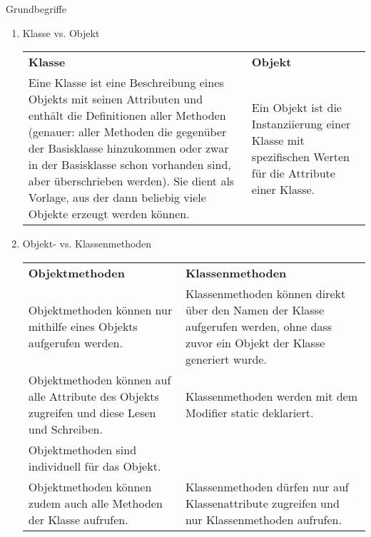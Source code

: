 \documentclass{../preamble}
\begin{document}
\begin{task}[credit = \stars{0}{3}]{Grundbegriffe}
    \begin{solution}
        \begin{enumerate}
            \item Klasse vs. Objekt
                  \begin{table}[h]
                      \centering
                      \begin{tabular}{p{22.5em}p{22.5em}}
                          \textbf{Klasse}                                                                                                                                                                                                                                                                                                                                       & \textbf{Objekt}
                          \\
                          Eine Klasse ist eine Beschreibung eines Objekts mit seinen Attributen und enthält die Definitionen aller Methoden (genauer: aller Methoden die gegenüber der Basisklasse hinzukommen oder zwar in der Basisklasse schon vorhanden sind, aber überschrieben werden). Sie dient als Vorlage, aus der dann beliebig viele Objekte erzeugt werden können. & Ein Objekt ist die Instanziierung einer Klasse mit spezifischen Werten für die Attribute einer Klasse.
                      \end{tabular}
                  \end{table}
            \item Objekt- vs. Klassenmethoden
                  \begin{table}[h]
                      \centering
                      \begin{tabular}{p{22.5em}p{22.5em}}
                          \textbf{Objektmethoden}                                                                       & \textbf{Klassenmethoden}
                          \\
                          Objektmethoden können nur mithilfe eines Objekts aufgerufen werden.                           & Klassenmethoden können direkt über den Namen der Klasse aufgerufen werden, ohne dass zuvor ein Objekt der Klasse generiert wurde.
                          \\
                          Objektmethoden können auf alle Attribute des Objekts zugreifen und diese Lesen und Schreiben. & Klassenmethoden werden mit dem Modifier \textcolor{keywordcolor}{static} deklariert.
                          \\
                          Objektmethoden sind individuell für das Objekt.
                          \\
                          Objektmethoden können zudem auch alle Methoden der Klasse aufrufen.                           & Klassenmethoden dürfen nur auf Klassenattribute zugreifen und nur Klassenmethoden aufrufen.
                      \end{tabular}
                  \end{table}
                  \clearpage


\end{enumerate}
\end{solution}
\end{task}
\end{document}

